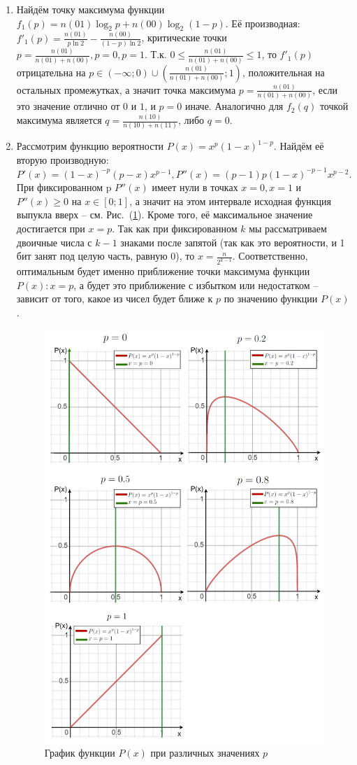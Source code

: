 \documentclass[12pt]{article}
\begin{document}
	\begin{enumerate}
	\item Найдём точку максимума функции $f_1(p) = n(01)\log_2{p} + n(00)\log_2{(1-p)}$. Её производная: $f'_1(p) = \frac{n(01)}{p\ln{2}} - \frac{n(00)}{(1-p)\ln{2}}$, критические точки $p=\frac{n(01)}{n(01)+n(00)},p=0,p=1$. Т.к. $0\le\frac{n(01)}{n(01)+n(00)}\le1$, то $f'_1(p)$ отрицательна на $p\in(-\infty;0)\cup\left(\frac{n(01)}{n(01)+n(00)};1\right)$, положительная на остальных промежутках, а значит точка максимума $p = \frac{n(01)}{n(01)+n(00)}$, если это значение отлично от $0$ и $1$, и $p=0$ иначе. Аналогично для $f_2(q)$ точкой максимума является $q=\frac{n(10)}{n(10)+n(11)}$, либо $q=0$.
	
	\item Рассмотрим функцию вероятности $P(x) = x^p(1-x)^{1-p}$. Найдём её вторую производную: $P'(x) = (1-x)^{-p} (p-x) x^{p-1}, P''(x)=(p-1) p (1-x)^{-p-1} x^{p-2}$. При фиксированном p $P''(x)$ имеет нули в точках $x=0, x=1$ и $P''(x)\ge0$ на $x\in[0;1]$, а значит на этом интервале исходная функция выпукла вверх -- см. Рис.~(\ref{pic:P(x,p)}). Кроме того, её максимальное значение достигается при $x=p$. Так как при фиксированном $k$ мы рассматриваем двоичные числа с $k-1$ знаками после запятой (так как это вероятности, и 1 бит занят под целую часть, равную $0$), то $x=\frac{n}{2^{k-1}}$. Соответственно, оптимальным будет именно приближение точки максимума функции $P(x): x = p$, а будет это приближение с избытком или недостатком -- зависит от того, какое из чисел будет ближе к $p$ по значению функции $P(x)$.
	
	\begin{figure}[h]
		\label{pic:P(x,p)}
		\centering
		\includegraphics[width=0.8\linewidth]{images/p(x,p).png}
		\caption{График функции $P(x)$ при различных значениях $p$}
	\end{figure}
	

\end{enumerate}
\end{document}
